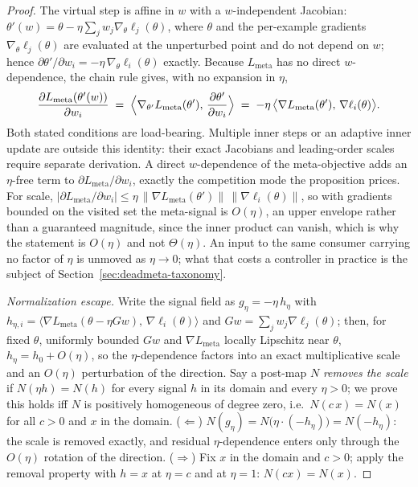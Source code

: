 \documentclass[10pt,letterpaper]{article}
\theoremstyle{remark}
\begin{document}
\begin{proof}
The virtual step is affine in $w$ with a $w$-independent Jacobian:
$\theta'(w) = \theta - \eta \sum_j w_j \nabla_\theta \ell_j(\theta)$,
where $\theta$ and the per-example gradients
$\nabla_\theta \ell_j(\theta)$ are evaluated at the unperturbed point and
do not depend on $w$; hence
$\partial \theta' / \partial w_i = -\eta\, \nabla_\theta \ell_i(\theta)$
exactly. Because $L_{\mathrm{meta}}$ has no direct $w$-dependence, the
chain rule gives, with no expansion in $\eta$,
\[
\frac{\partial L_{\mathrm{meta}}(\theta'(w))}{\partial w_i}
\;=\; \Bigl\langle \nabla_{\theta'} L_{\mathrm{meta}}(\theta'),\,
\frac{\partial \theta'}{\partial w_i} \Bigr\rangle
\;=\; -\eta\, \bigl\langle \nabla L_{\mathrm{meta}}(\theta'),\,
\nabla \ell_i(\theta) \bigr\rangle .
\]
Both stated conditions are load-bearing. Multiple inner steps or an
adaptive inner update are outside this identity: their exact Jacobians and
leading-order scales require separate derivation. A direct $w$-dependence
of the meta-objective adds an
$\eta$-free term to $\partial L_{\mathrm{meta}} / \partial w_i$, exactly
the competition mode the proposition prices. For scale,
$|\partial L_{\mathrm{meta}} / \partial w_i| \le
\eta\, \lVert \nabla L_{\mathrm{meta}}(\theta') \rVert\,
\lVert \nabla \ell_i(\theta) \rVert$, so with gradients bounded on the
visited set the meta-signal is $O(\eta)$, an upper envelope rather than
a guaranteed magnitude, since the inner product can vanish, which is why
the statement is $O(\eta)$ and not $\Theta(\eta)$. An input to the same
consumer carrying no factor of $\eta$ is unmoved as $\eta \to 0$; what that
costs a controller in practice is the subject of
Section~\ref{sec:deadmeta-taxonomy}.

\emph{Normalization escape.} Write the signal field as
$g_\eta = -\eta\, h_\eta$ with
$h_{\eta,i} = \langle \nabla L_{\mathrm{meta}}(\theta - \eta G w),\,
\nabla \ell_i(\theta) \rangle$ and
$Gw = \sum_j w_j \nabla \ell_j(\theta)$; then, for fixed $\theta$,
uniformly bounded $Gw$ and $\nabla L_{\mathrm{meta}}$ locally Lipschitz near $\theta$,
$h_\eta = h_0 + O(\eta)$, so the $\eta$-dependence factors into an exact
multiplicative scale and an $O(\eta)$ perturbation of the direction. Say a
post-map $N$ \emph{removes the scale} if $N(\eta h) = N(h)$ for every
signal $h$ in its domain and every $\eta > 0$; we prove this holds iff $N$
is positively homogeneous of degree zero, i.e.\ $N(c\,x) = N(x)$ for all
$c > 0$ and $x$ in the domain.
($\Leftarrow$) $N(g_\eta) = N\bigl(\eta \cdot (-h_\eta)\bigr) =
N(-h_\eta)$: the scale is removed exactly, and residual $\eta$-dependence
enters only through the $O(\eta)$ rotation of the direction.
($\Rightarrow$) Fix $x$ in the domain and $c > 0$; apply the removal
property with $h = x$ at $\eta = c$ and at $\eta = 1$:
$N(cx) = N(x)$.
\end{proof}
\end{document}
